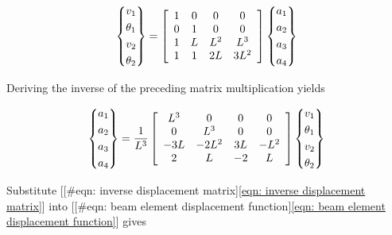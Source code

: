 \documentclass[a4paper,openany,12pt]{book}
\begin{document}
{{$$\left\{ \begin{gathered}
  v_1 \hfill \\
  \theta _1 \hfill \\
  v_2 \hfill \\
  \theta _2 \hfill \\ 
\end{gathered}  \right\} = \left[ {\begin{array}{*{20}{c}}
  1&0&0&0 \\ 
  0&1&0&0 \\ 
  1&L&L^2&L^3 \\ 
  1&1&2L&3L^2 
\end{array}} \right]\left\{ \begin{gathered}
  a_1 \hfill \\
  a_2 \hfill \\
  a_3 \hfill \\
  a_4 \hfill \\ 
\end{gathered}  \right\}$$

Deriving the inverse of the preceding matrix multiplication yields

\begin{gather*}
\label{eqn: inverse displacement matrix}
  \left\{
    \begin{gathered}
      a_1 \hfill \\
      a_2 \hfill \\
      a_3 \hfill \\
      a_4 \hfill \\ 
    \end{gathered}  \right\} = \frac{1}{L^3}\left[{
      \begin{array}{*{20}{c}}
        L^3&0&0&0 \\ 
        0&L^3&0&0 \\ 
        -3L&-2L^2&3L&-L^2 \\ 
        2&L&-2&L 
      \end{array}} \right]\left\{
    \begin{gathered}
      v_1 \hfill \\
      \theta_1 \hfill \\
      v_2 \hfill \\
      \theta_2 \hfill \\ 
    \end{gathered}  \right\}
\end{gather*}

Substitute
[[\#eqn: inverse displacement matrix]\ref{eqn: inverse displacement matrix}]
into
[[\#eqn: beam element displacement function]\ref{eqn: beam element displacement function}]
gives

}}
\end{document}
